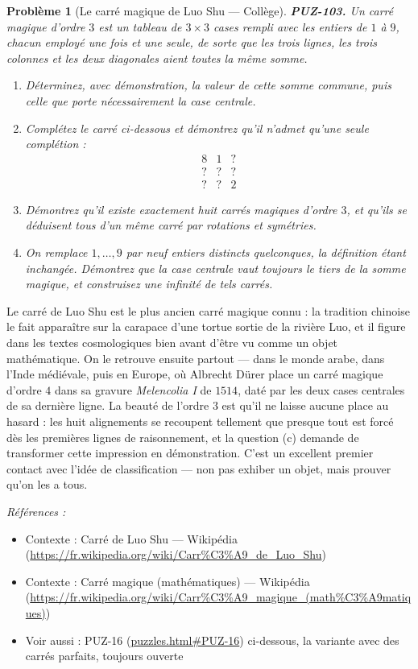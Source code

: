 \documentclass[11pt]{article}
\newtheorem{problem}{Problème}
\newenvironment{refs}{\par\small\noindent\emph{Références :}\begin{itemize}\setlength\itemsep{0pt}}{\end{itemize}\normalsize}
\begin{document}
\begin{problem}[{Le carré magique de Luo Shu --- Collège}]
\textbf{PUZ-103.} Un carré magique d'ordre $ 3 $ est un tableau de $ 3 \times 3 $ cases
rempli avec les entiers de $ 1 $ à $ 9 $, chacun employé une fois et une seule, de sorte
que les trois lignes, les trois colonnes et les deux diagonales aient toutes la même
somme.
\begin{enumerate}
\item[(a)] Déterminez, avec démonstration, la valeur de cette somme commune, puis celle que porte
nécessairement la case centrale.
\item[(b)] Complétez le carré ci-dessous et démontrez qu'il n'admet qu'une seule complétion :
\[ \begin{array}{ccc} 8 & 1 & ? \\ ? & ? & ? \\ ? & ? & 2 \end{array} \]
\item[(c)] Démontrez qu'il existe exactement huit carrés magiques d'ordre $ 3 $, et qu'ils se
déduisent tous d'un même carré par rotations et symétries.
\item[(d)] On remplace $ 1, \dots, 9 $ par neuf entiers distincts quelconques, la définition étant
inchangée. Démontrez que la case centrale vaut toujours le tiers de la somme magique, et
construisez une infinité de tels carrés.
\end{enumerate}

\end{problem}

\noindent Le carré de Luo Shu est le plus ancien carré magique connu : la tradition
chinoise le fait apparaître sur la carapace d'une tortue sortie de la rivière Luo, et il
figure dans les textes cosmologiques bien avant d'être vu comme un objet mathématique. On le
retrouve ensuite partout --- dans le monde arabe, dans l'Inde médiévale, puis en Europe, où
Albrecht Dürer place un carré magique d'ordre $ 4 $ dans sa gravure \textit{Melencolia I} de
$ 1514 $, daté par les deux cases centrales de sa dernière ligne. La beauté de l'ordre
$ 3 $ est qu'il ne laisse aucune place au hasard : les huit alignements se recoupent
tellement que presque tout est forcé dès les premières lignes de raisonnement, et la question
(c) demande de transformer cette impression en démonstration. C'est un excellent premier
contact avec l'idée de classification --- non pas exhiber un objet, mais prouver qu'on les a
tous.

\begin{refs}
\item Contexte : Carré de Luo Shu --- Wikipédia (\url{https://fr.wikipedia.org/wiki/Carr%C3%A9_de_Luo_Shu})
\item Contexte : Carré magique (mathématiques) --- Wikipédia (\url{https://fr.wikipedia.org/wiki/Carr%C3%A9_magique_(math%C3%A9matiques)})
\item Voir aussi : PUZ-16 (\url{puzzles.html#PUZ-16}) ci-dessous, la variante avec des carrés parfaits, toujours ouverte
\end{refs}
\end{document}
